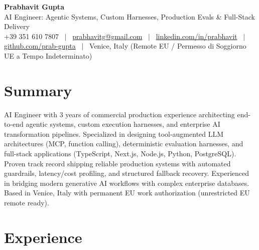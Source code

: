 \documentclass[a4paper,10pt]{article}
\begin{document}
\begin{minipage}[c]{0.80\textwidth}
  {\Huge\bfseries Prabhavit Gupta}\\[3pt]
  {\color{accent}\large AI Engineer: Agentic Systems, Custom Harnesses, Production Evals \& Full-Stack Delivery}\\[6pt]
  {\footnotesize +39 351 610 7807 ~$\vert$~
  \href{mailto:prabhavitg@gmail.com}{prabhavitg@gmail.com} ~$\vert$~
  \href{https://www.linkedin.com/in/prabhavit/}{linkedin.com/in/prabhavit} ~$\vert$~
  \href{https://github.com/prab-gupta}{github.com/prab-gupta} ~$\vert$~
  Venice, Italy (Remote EU / Permesso di Soggiorno UE a Tempo Indeterminato)}
\end{minipage}\hfill

\section{Summary}
AI Engineer with 3 years of commercial production experience architecting end-to-end agentic systems, custom execution harnesses, and enterprise AI transformation pipelines. Specialized in designing tool-augmented LLM architectures (MCP, function calling), deterministic evaluation harnesses, and full-stack applications (TypeScript, Next.js, Node.js, Python, PostgreSQL). Proven track record shipping reliable production systems with automated guardrails, latency/cost profiling, and structured fallback recovery. Experienced in bridging modern generative AI workflows with complex enterprise databases. Based in Venice, Italy with permanent EU work authorization (unrestricted EU remote ready).

\section{Experience}
\end{document}
